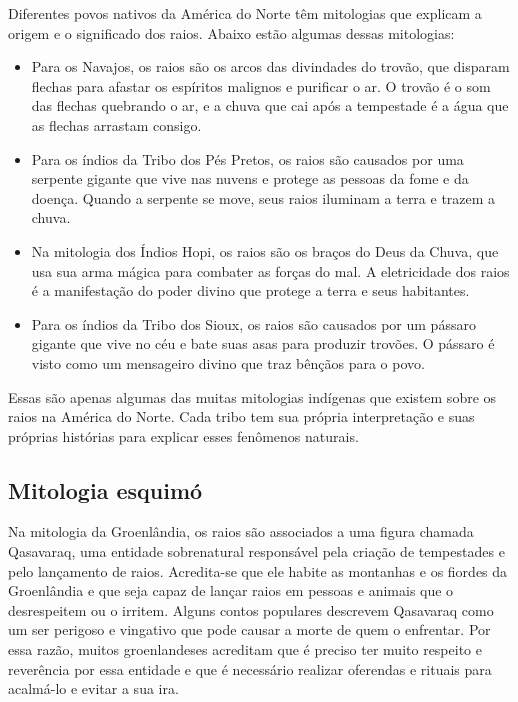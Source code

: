 \documentclass[a4paper, 12pt, onecolumn,singlespacing]{article}
\begin{document}
	Diferentes povos nativos da América do Norte têm mitologias que explicam a origem e o significado dos raios. Abaixo estão algumas dessas mitologias:
	\begin{itemize}
		\item Para os Navajos, os raios são os arcos das divindades do trovão, que disparam flechas para afastar os espíritos malignos e purificar o ar. O trovão é o som das flechas quebrando o ar, e a chuva que cai após a tempestade é a água que as flechas arrastam consigo.
		
		\item Para os índios da Tribo dos Pés Pretos, os raios são causados por uma serpente gigante que vive nas nuvens e protege as pessoas da fome e da doença. Quando a serpente se move, seus raios iluminam a terra e trazem a chuva.
		
		\item Na mitologia dos Índios Hopi, os raios são os braços do Deus da Chuva, que usa sua arma mágica para combater as forças do mal. A eletricidade dos raios é a manifestação do poder divino que protege a terra e seus habitantes.
		
		\item Para os índios da Tribo dos Sioux, os raios são causados por um pássaro gigante que vive no céu e bate suas asas para produzir trovões. O pássaro é visto como um mensageiro divino que traz bênçãos para o povo.
		
	\end{itemize}
	
	Essas são apenas algumas das muitas mitologias indígenas que existem sobre os raios na América do Norte. Cada tribo tem sua própria interpretação e suas próprias histórias para explicar esses fenômenos naturais.
	
	\subsection{Mitologia esquimó}
	
	Na mitologia da Groenlândia, os raios são associados a uma figura chamada Qasavaraq, uma entidade sobrenatural responsável pela criação de tempestades e pelo lançamento de raios. Acredita-se que ele habite as montanhas e os fiordes da Groenlândia e que seja capaz de lançar raios em pessoas e animais que o desrespeitem ou o irritem. Alguns contos populares descrevem Qasavaraq como um ser perigoso e vingativo que pode causar a morte de quem o enfrentar. Por essa razão, muitos groenlandeses acreditam que é preciso ter muito respeito e reverência por essa entidade e que é necessário realizar oferendas e rituais para acalmá-lo e evitar a sua ira.
	
\end{document}
